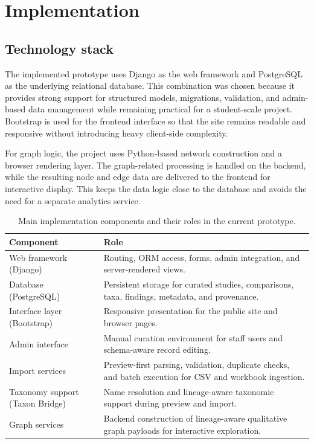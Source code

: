 \section{Implementation}

\subsection{Technology stack}

The implemented prototype uses Django as the web framework and PostgreSQL as the underlying relational database. This combination was chosen because it provides strong support for structured models, migrations, validation, and admin-based data management while remaining practical for a student-scale project. Bootstrap is used for the frontend interface so that the site remains readable and responsive without introducing heavy client-side complexity.

For graph logic, the project uses Python-based network construction and a browser rendering layer. The graph-related processing is handled on the backend, while the resulting node and edge data are delivered to the frontend for interactive display. This keeps the data logic close to the database and avoids the need for a separate analytics service.

\begin{table}[htbp]
    \centering
    \small
    \caption{Main implementation components and their roles in the current prototype.}
    \label{tab:stack}
    \begin{tabularx}{0.98\linewidth}{>{\raggedright\arraybackslash}p{3.6cm} >{\raggedright\arraybackslash}X}
        \toprule
        \textbf{Component} & \textbf{Role} \\
        \midrule
        Web framework (Django) & Routing, ORM access, forms, admin integration, and server-rendered views. \\
        Database (PostgreSQL) & Persistent storage for curated studies, comparisons, taxa, findings, metadata, and provenance. \\
        Interface layer (Bootstrap) & Responsive presentation for the public site and browser pages. \\
        Admin interface & Manual curation environment for staff users and schema-aware record editing. \\
        Import services & Preview-first parsing, validation, duplicate checks, and batch execution for CSV and workbook ingestion. \\
        Taxonomy support (Taxon Bridge) & Name resolution and lineage-aware taxonomic support during preview and import. \\
        Graph services & Backend construction of lineage-aware qualitative graph payloads for interactive exploration. \\
        \bottomrule
    \end{tabularx}
\end{table}

